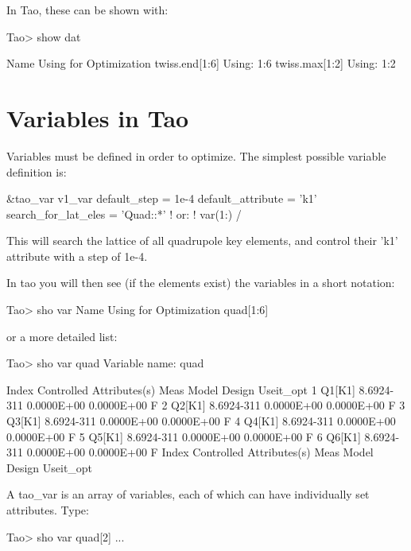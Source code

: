 \documentclass{hitec}
\newcommand{\Section}[1]{\section{#1}\vspace*{-1ex}}
\begin{document}
In Tao, these can be shown with:
{\small
\begin{code}
Tao> show dat

  Name                                 Using for Optimization
  twiss.end[1:6]                                 Using: 1:6
  twiss.max[1:2]                                 Using: 1:2
\end{code}}


\Section{Variables in Tao}



Variables must be defined in order to optimize. The simplest possible variable definition is: 
{\small
\begin{code}
    &tao_var
      v1_var%
      default_step = 1e-4
      default_attribute = 'k1'
      search_for_lat_eles = 'Quad::*'
      ! or: 
      ! var(1:)%
    /
\end{code}}

This will search the lattice of all quadrupole key elements, and control their 'k1' attribute with a step of 1e-4.

In tao you will then see (if the elements exist) the variables in a short notation:
{\small
\begin{code}
Tao> sho var
       Name                                      Using for Optimization
    quad[1:6]
\end{code}}

or a more detailed list:
{\small
\begin{code}
Tao> sho var quad
Variable name:  quad

 Index  Controlled Attributes(s)    Meas         Model        Design  Useit_opt
     1  Q1[K1]                  8.6924-311    0.0000E+00    0.0000E+00       F
     2  Q2[K1]                  8.6924-311    0.0000E+00    0.0000E+00       F
     3  Q3[K1]                  8.6924-311    0.0000E+00    0.0000E+00       F
     4  Q4[K1]                  8.6924-311    0.0000E+00    0.0000E+00       F
     5  Q5[K1]                  8.6924-311    0.0000E+00    0.0000E+00       F
     6  Q6[K1]                  8.6924-311    0.0000E+00    0.0000E+00       F
 Index  Controlled Attributes(s)    Meas         Model        Design  Useit_opt
\end{code}}

A tao_var is an array of variables, each of which can have individually set attributes. Type: 
{\small
\begin{code}
Tao> sho var quad[2]
...
\end{code}}
\end{document}
